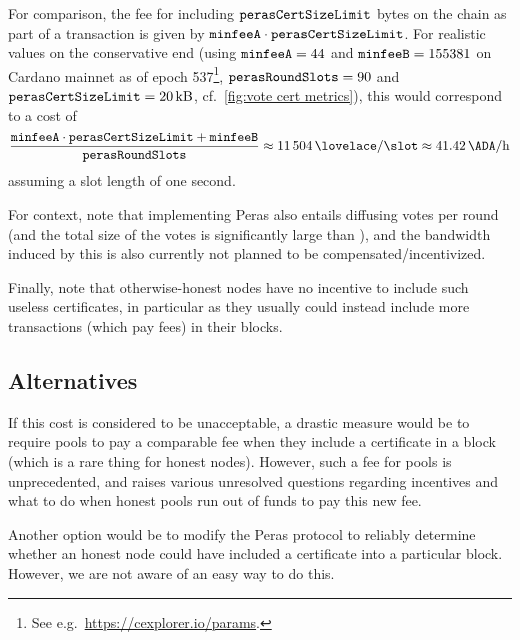 For comparison, the fee for including $\mathtt{perasCertSizeLimit}$ bytes on the chain as part of a transaction is given by $\mathtt{minfeeA}\cdot \mathtt{perasCertSizeLimit}$.
For realistic values on the conservative end (using $\mathtt{minfeeA} = 44$ and $\mathtt{minfeeB} = 155381$ on Cardano mainnet as of epoch 537\footnote{See e.g.\ \url{https://cexplorer.io/params}.}, $\mathtt{perasRoundSlots}=90$ and $\mathtt{perasCertSizeLimit} = \SI{20}{kB}$, cf.~\cref{fig:vote cert metrics}), this would correspond to a cost of
\[ \frac{\mi{minfeeA\cdot \perasCertSizeLimit + \mi{minfeeB}}}{\perasRoundSlots} \approx \SI{11504}{\lovelace/\slot} \approx \SI{41.42}{\ADA/h} \]
assuming a slot length of one second.

For context, note that implementing Peras also entails diffusing \perasN{} votes per round (and the total size of the votes is significantly large than \perasCertSizeLimit{}), and the bandwidth induced by this is also currently not planned to be compensated/incentivized.

Finally, note that otherwise-honest nodes have no incentive to include such useless certificates, in particular as they usually could instead include more transactions (which pay fees) in their blocks.

\subsection{Alternatives}
If this cost is considered to be unacceptable, a drastic measure would be to require pools to pay a comparable fee when they include a certificate in a block (which is a rare thing for honest nodes).
However, such a fee for pools is unprecedented, and raises various unresolved questions regarding incentives and what to do when honest pools run out of funds to pay this new fee.

Another option would be to modify the Peras protocol to reliably determine whether an honest node could have included a certificate into a particular block.
However, we are not aware of an easy way to do this.


